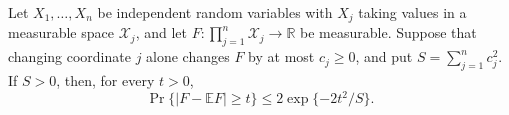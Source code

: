 Let \(X_1,\ldots,X_n\) be independent random variables with \(X_j\) taking values in a measurable space \(\mathcal X_j\), and let \(F:\prod_{j=1}^n\mathcal X_j\to\mathbb R\) be measurable.  Suppose that changing coordinate \(j\) alone changes \(F\) by at most \(c_j\geq0\), and put \(S=\sum_{j=1}^nc_j^2\).  If \(S>0\), then, for every \(t>0\),
\[
 \Pr\{|F-\mathbb EF|\geq t\}\leq2\exp\{-2t^2/S\}.
\]